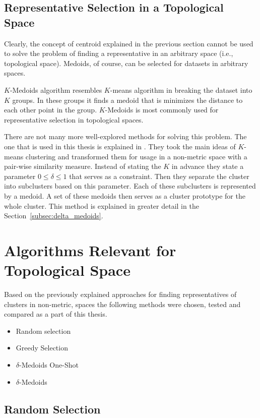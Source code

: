 \documentclass[thesis=B,english]{FITthesis}[2012/10/20]
\begin{document}
\subsection{Representative Selection in a Topological Space}\label{sec:rep_select_arbitrary}
Clearly, the concept of centroid explained in the previous section cannot be used to solve the problem of finding a representative in an arbitrary space (i.e., topological space).
Medoids, of course, can be selected for datasets in arbitrary spaces.

$K$-Medoids algorithm resembles $K$-means algorithm in breaking the dataset into $K$ groups.
In these groups it finds a medoid that is minimizes the distance to each other point in the group.
$K$-Medoids is most commonly used for representative selection in topological spaces.

There are not many more well-explored methods for solving this problem.
The one that is used in this thesis is explained in \cite{liebman2015representative}.
They took the main ideas of $K$-means clustering and transformed them for usage in a non-metric space with a pair-wise similarity measure.
Instead of stating the $K$ in advance they state a parameter  $ 0 \leq \delta \leq 1$ that serves as a constraint.
Then they separate the cluster into subclusters based on this parameter.
Each of these subclusters is represented by a medoid.
A set of these medoids then serves as a cluster prototype for the whole cluster.
This method is explained in greater detail in the Section~\ref{subsec:delta_medoids}.

\section{Algorithms Relevant for Topological Space}\label{sec:relevant_methods}
Based on the previously explained approaches for finding representatives of clusters in non-metric, spaces the following methods were chosen, tested and compared as a part of this thesis.
\begin{itemize}
    \item Random selection
    \item Greedy Selection
    \item $\delta$-Medoids One-Shot
    \item $\delta$-Medoids
\end{itemize}

\subsection{Random Selection}\label{subsec:random_select}
\end{document}
